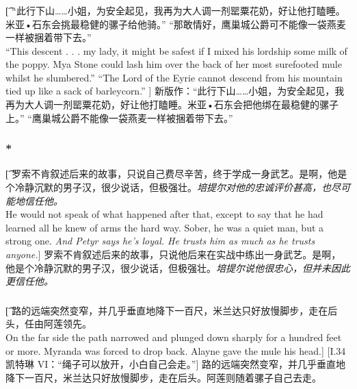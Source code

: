 \documentclass[12pt,a4paper]{article}
\begin{document}
\subsubsection{}\t[
	“此行下山……小姐，为安全起见，我再为大人调一剂罂粟花奶，好让他打瞌睡。米亚•石东会挑最稳健的骡子给他骑。” “那敢情好，鹰巢城公爵可不能像一袋燕麦一样被捆着带下去。”\\
	“This descent . . . my lady, it might be safest if I mixed his lordship some milk of the poppy. Mya Stone could lash him over the back of her most surefooted mule whilst he slumbered.” “The Lord of the Eyrie cannot descend from his mountain tied up like a sack of barleycorn.” ]
	新版作：“此行下山……小姐，为安全起见，我再为大人调一剂罂粟花奶，好让他打瞌睡。米亚•石东会把他绑在最稳健的骡子上。” “鹰巢城公爵不能像一袋燕麦一样被捆着带下去。”
	
\subsubsection{\color{red}*}\t[
	罗索不肯叙述后来的故事，只说自己费尽辛苦，终于学成一身武艺。是啊，他是个冷静沉默的男子汉，很少说话，但极强壮。\emph{培提尔对他的忠诚评价甚高，也尽可能地信任他。}\\
	He would not speak of what happened after that, except to say that he had learned all he knew of arms the hard way. Sober, he was a quiet man, but a strong one. \emph{And Petyr says he's loyal. He trusts him as much as he trusts anyone.}]
	罗索不肯叙述后来的故事，只说他后来在实战中练出一身武艺。是啊，他是个冷静沉默的男子汉，很少说话，但极强壮。\emph{培提尔说他很忠心，但并未因此更信任他。}

\subsubsection{}\t[	
	路的远端突然变窄，并几乎垂直地降下一百尺，米兰达只好放慢脚步，走在后头，任由阿莲领先。\\
	On the far side the path narrowed and plunged down sharply for a hundred feet or more. Myranda was forced to drop back. Alayne gave the mule his head.]
	[I.34 凯特琳 VI：“绳子可以放开，小白自己会走。”]
	路的远端突然变窄，并几乎垂直地降下一百尺，米兰达只好放慢脚步，走在后头。阿莲则随着骡子自己去走。
	
\end{document}
